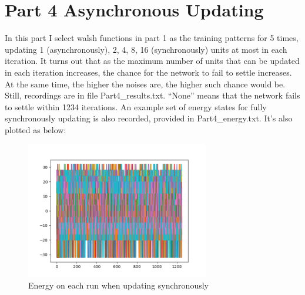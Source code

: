 \documentclass{article}
\begin{document}
\section*{Part 4 Asynchronous Updating}
In this part I select walsh functions in part 1 as the training patterns for 5 times, updating 1 (asynchronously), 2, 4, 8, 16 (synchronously) units at most in each iteration.
It turns out that as the maximum number of units that can be updated in each iteration increases, the chance for the network to fail to settle increases.
At the same time, the higher the noises are, the higher such chance would be.
Still, recordings are in file Part4\_results.txt. ``None'' means that the network fails to settle within 1234 iterations. An example set of energy states for fully synchronously updating is also recorded, provided in Part4\_energy.txt. It's also plotted as below:
\begin{figure}[h]
    \centering
    \includegraphics[width=8cm]{Part4energy}
    \caption{Energy on each run when updating synchronously}
\end{figure}
\end{document}
